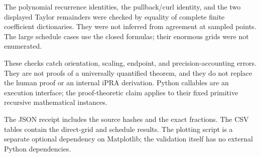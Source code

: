 The polynomial recurrence identities, the pullback/curl identity, and
the two displayed Taylor remainders were checked by equality of complete
finite coefficient dictionaries. They were not inferred from agreement
at sampled points. The large schedule cases use the closed formulas;
their enormous grids were not enumerated.

These checks catch orientation, scaling, endpoint, and precision-accounting
errors. They are not proofs of a universally quantified theorem, and they
do not replace the human proof or an internal iPRA derivation. Python
callables are an execution interface; the proof-theoretic claim applies
to their fixed primitive recursive mathematical instances.

The JSON receipt includes the source hashes and the exact fractions.
The CSV tables contain the direct-grid and schedule results.
The plotting script is a separate optional dependency on Matplotlib;
the validation itself has no external Python dependencies.
